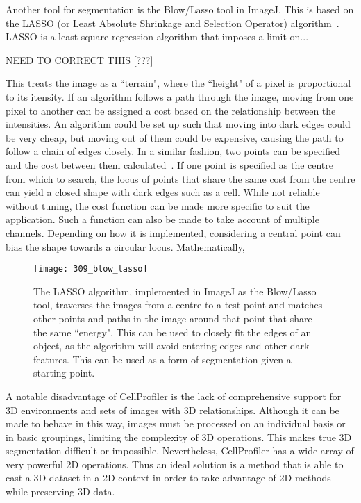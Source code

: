 Another tool for segmentation is the Blow/Lasso tool in ImageJ. This is based on the LASSO (or Least Absolute Shrinkage and Selection Operator) algorithm~\cite{}. LASSO is a least square regression algorithm that imposes a limit on...

NEED TO CORRECT THIS [???]

This treats the image as a ``terrain", where the ``height" of a pixel is proportional to its itensity. If an algorithm follows a path through the image, moving from one pixel to another can be assigned a cost based on the relationship between the intensities. An algorithm could be set up such that moving into dark edges could be very cheap, but moving out of them could be expensive, causing the path to follow a chain of edges closely. In a similar fashion, two points can be specified and the cost between them calculated~\cite{}. If one point is specified as the centre from which to search, the locus of points that share the same cost from the centre can yield a closed shape with dark edges such as a cell. While not reliable without tuning, the cost function can be made more specific to suit the application. Such a function can also be made to take account of multiple channels. Depending on how it is implemented, considering a central point can bias the shape towards a circular locus. Mathematically,

\begin{figure}[h!]
 \centering
 \texttt{[image: 309\_blow\_lasso]}
 \caption[The LASSO tool]{
 	The LASSO algorithm, implemented in ImageJ as the Blow/Lasso tool, traverses the images from a centre to a test point and matches other points and paths in the image around that point that share the same ``energy". This can be used to closely fit the edges of an object, as the algorithm will avoid entering edges and other dark features. This can be used as a form of segmentation given a starting point.
 }
 \label{fig:blow}
\end{figure}

A notable disadvantage of CellProfiler is the lack of comprehensive support for 3D environments and sets of images with 3D relationships. Although it can be made to behave in this way, images must be processed on an individual basis or in basic groupings, limiting the complexity of 3D operations. This makes true 3D segmentation difficult or impossible. Nevertheless, CellProfiler has a wide array of very powerful 2D operations. Thus an ideal solution is a method that is able to cast a 3D dataset in a 2D context in order to take advantage of 2D methods while preserving 3D data.

